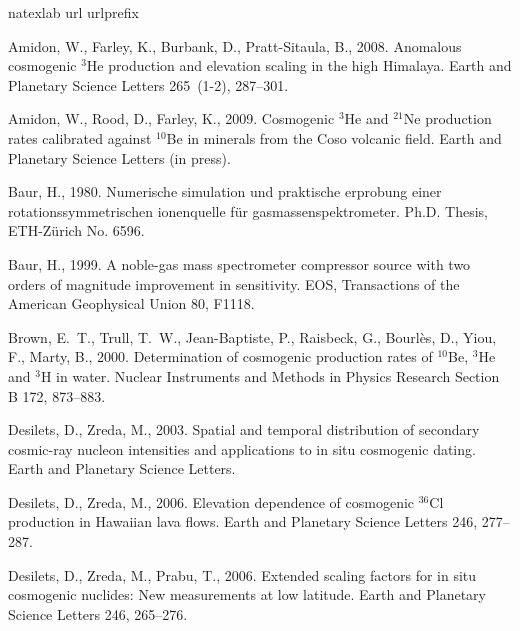 \documentclass{article}
\begin{document}
\begin{thebibliography}{34}
\expandafter\ifx\csname natexlab\endcsname\relax\def\natexlab#1{#1}\fi
\expandafter\ifx\csname url\endcsname\relax
  \def\url#1{\texttt{#1}}\fi
\expandafter\ifx\csname urlprefix\endcsname\relax\def\urlprefix{URL }\fi

Amidon, W., Farley, K., Burbank, D., Pratt-Sitaula, B., 2008. Anomalous
  cosmogenic $^3${H}e production and elevation scaling in the high {H}imalaya.
  Earth and Planetary Science Letters 265~(1-2), 287--301.

Amidon, W., Rood, D., Farley, K., 2009. Cosmogenic $^3${H}e and $^{21}${N}e
  production rates calibrated against $^{10}${B}e in minerals from the {C}oso
  volcanic field. Earth and Planetary Science Letters (in press).

Baur, H., 1980. Numerische simulation und praktische erprobung einer
  rotationssymmetrischen ionenquelle f\"{u}r gasmassenspektrometer. Ph.D.
  Thesis, ETH-Z\"{u}rich No. 6596.

Baur, H., 1999. A noble-gas mass spectrometer compressor source with two orders
  of magnitude improvement in sensitivity. EOS, Transactions of the American
  Geophysical Union 80, F1118.

Brown, E.~T., Trull, T.~W., Jean-Baptiste, P., Raisbeck, G., Bourl\`{e}s, D.,
  Yiou, F., Marty, B., 2000. Determination of cosmogenic production rates of
  $^{10}${B}e, $^{3}${H}e and $^3${H} in water. Nuclear Instruments and Methods
  in Physics Research Section B 172, 873--883.

Desilets, D., Zreda, M., 2003. Spatial and temporal distribution of secondary
  cosmic-ray nucleon intensities and applications to in situ cosmogenic dating.
  Earth and Planetary Science Letters.

Desilets, D., Zreda, M., 2006. Elevation dependence of cosmogenic $^{36}${C}l
  production in {H}awaiian lava flows. Earth and Planetary Science Letters 246,
  277--287.

{Desilets}, D., {Zreda}, M., {Prabu}, T., 2006. {Extended scaling factors for
  in situ cosmogenic nuclides: New measurements at low latitude}. Earth and
  Planetary Science Letters 246, 265--276.


\end{thebibliography}
\end{document}

